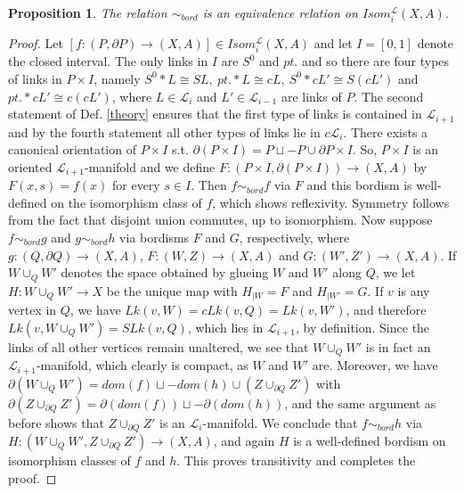 \documentclass{scrreprt}
\newtheorem{prop}{Proposition}[chapter]
\begin{document}
\begin{prop}
The relation $\sim_{bord} $ is an equivalence relation on $Isom_{i}^{\mathcal{L}}(X,A)$.
\end{prop}

\begin{proof}
Let $[f: (P, \partial P) \to (X,A)] \in Isom_{i}^{\mathcal{L}}(X,A)$ and let $I=[0,1]$ denote the closed interval. The only links in $I$ are $S^0$ and $pt.$ and so there are four types of links in $P \times I$, namely $S^0 * L \cong SL,\  pt. * L \cong cL,\  S^0 * cL' \cong S(cL')$ and $pt. * cL' \cong c(cL')$, where $L \in \mathcal{L}_i$ and $L' \in \mathcal{L}_{i-1}$ are links of $P$. The second statement of Def. \ref{theory} ensures that the first type of links is contained in $\mathcal{L}_{i+1}$ and by the fourth statement all other types of links lie in $c \mathcal{L}_i$. There exists a canonical orientation of $P \times I$ s.t. $\partial (P \times I)= P \sqcup -P \cup \partial P \times I$. So, $P \times I$ is an oriented $\mathcal{L}_{i+1}$-manifold and we define $F: (P \times I, \partial(P \times I)) \to (X,A)$ by $F(x,s)=f(x)$ for every $s \in I$. Then $f \sim_{bord} f$ via $F$ and this bordism is well-defined on the isomorphism class of $f$, which shows reflexivity. Symmetry follows from the fact that disjoint union commutes, up to isomorphism. Now suppose $f \sim_{bord} g$ and $g \sim_{bord} h$ via bordisms $F$ and $G$, respectively, where $g: (Q, \partial Q) \to (X,A)$, $F: (W,Z) \to (X,A)$ and $G: (W',Z') \to (X,A)$. If $W \cup_{Q} W'$ denotes the space obtained by glueing $W$ and $W'$ along $Q$, we let $H: W \cup_{Q} W' \to X$ be the unique map with $H_{|W} = F$ and $H_{|W'}=G$. If $v$ is any vertex in $Q$, we have $Lk(v,W)=cLk(v,Q)=Lk(v,W')$, and therefore $Lk(v,W \cup_{Q} W') = SLk(v,Q)$, which lies in $\mathcal{L}_{i+1}$, by definition. Since the links of all other vertices remain unaltered, we see that $W \cup_{Q} W'$ is in fact an $\mathcal{L}_{i+1}$-manifold, which clearly is compact, as $W$ and $W'$ are. Moreover, we have $\partial (W \cup_{Q} W')= dom(f) \sqcup -dom(h) \cup (Z \cup_{\partial Q} Z')$ with $\partial (Z \cup_{\partial Q} Z')= \partial (dom(f)) \sqcup - \partial (dom(h))$, and the same argument as before shows that $Z \cup_{\partial Q} Z'$ is an $\mathcal{L}_i$-manifold. We conclude that $f \sim_{bord} h$ via $H: (W \cup_{Q} W',Z \cup_{\partial Q} Z') \to (X,A)$, and again $H$ is a well-defined bordism on isomorphism classes of $f$ and $h$. This proves transitivity and completes the proof.
\end{proof}
\end{document}
